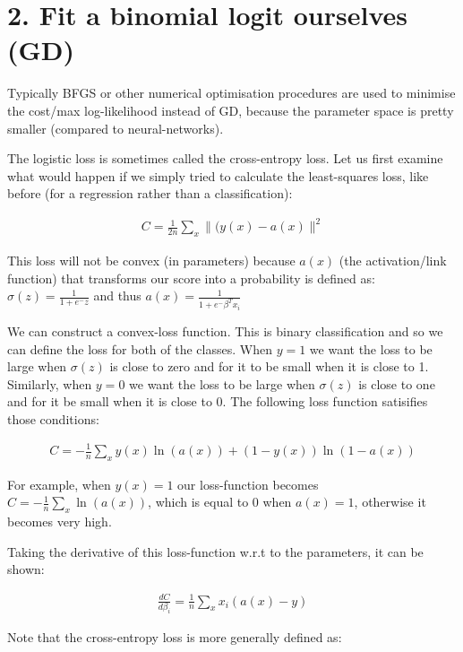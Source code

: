 \documentclass[]{book}
\begin{document}
\hypertarget{fit-a-binomial-logit-ourselves-gd}{%
\section{2. Fit a binomial logit ourselves (GD)}\label{fit-a-binomial-logit-ourselves-gd}}

Typically BFGS or other numerical optimisation procedures are used to minimise the cost/max log-likelihood instead of GD, because the parameter space is pretty smaller (compared to neural-networks).

The logistic loss is sometimes called the cross-entropy loss. Let us first examine what would happen if we simply tried to calculate the least-squares loss, like before (for a regression rather than a classification):

\[\begin{aligned} 
   C = \frac{1}{2n}\sum_x\|(y(x) - a(x)\|^2
\end{aligned}\]

This loss will not be convex (in parameters) because \(a(x)\) (the activation/link function) that transforms our score into a probability is defined as: \(\sigma(z)=\frac{1}{1+e^-z}\) and thus \(a(x)=\frac{1}{1+e^-\beta^Tx_i}\)

We can construct a convex-loss function. This is binary classification and so we can define the loss for both of the classes. When \(y=1\) we want the loss to be large when \(\sigma(z)\) is close to zero and for it to be small when it is close to 1. Similarly, when \(y=0\) we want the loss to be large when \(\sigma(z)\) is close to one and for it be small when it is close to 0. The following loss function satisifies those conditions:

\[\begin{aligned} 
   C = -\frac{1}{n}\sum_xy(x)\ln(a(x)) + (1 - y(x))\ln(1-a(x))
\end{aligned}\]

For example, when \(y(x)=1\) our loss-function becomes \(C = -\frac{1}{n}\sum_x\ln(a(x))\), which is equal to 0 when \(a(x)=1\), otherwise it becomes very high.

Taking the derivative of this loss-function w.r.t to the parameters, it can be shown:

\[\begin{aligned} 
    \frac{dC}{d\beta_i} = \frac{1}{n}\sum_xx_i(a(x) - y)
\end{aligned}\]

Note that the cross-entropy loss is more generally defined as:
\end{document}
